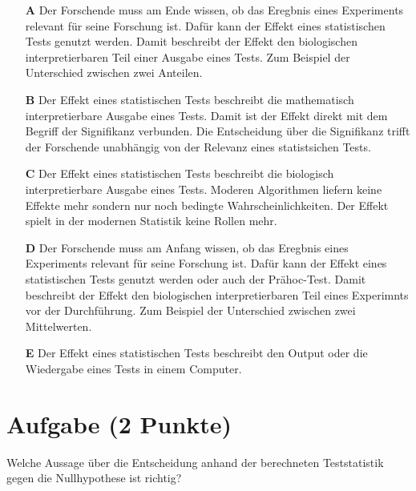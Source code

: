 \documentclass[a4paper, 9pt]{scrartcl}\usepackage[]{graphicx}\usepackage[]{xcolor}
\begin{document}
\begin{enumerate}
\item [\textbf{A} \msquare] Der Forschende muss am Ende wissen, ob das Eregbnis eines Experiments relevant für seine Forschung ist. Dafür kann der Effekt eines statistischen Tests genutzt werden. Damit beschreibt der Effekt den biologischen interpretierbaren Teil einer Ausgabe eines Tests. Zum Beispiel der Unterschied zwischen zwei Anteilen.
\item [\textbf{B} \msquare] Der Effekt eines statistischen Tests beschreibt die mathematisch interpretierbare Ausgabe eines Tests. Damit ist der Effekt direkt mit dem Begriff der Signifikanz verbunden. Die Entscheidung über die Signifikanz trifft der Forschende unabhängig von der Relevanz eines statistsichen Tests.
\item [\textbf{C} \msquare] Der Effekt eines statistischen Tests beschreibt die biologisch interpretierbare Ausgabe eines Tests. Moderen Algorithmen liefern keine Effekte mehr sondern nur noch bedingte Wahrscheinlichkeiten. Der Effekt spielt in der modernen Statistik keine Rollen mehr.
\item [\textbf{D} \msquare] Der Forschende muss am Anfang wissen, ob das Eregbnis eines Experiments relevant für seine Forschung ist. Dafür kann der Effekt eines statistischen Tests genutzt werden oder auch der Prähoc-Test. Damit beschreibt der Effekt den biologischen interpretierbaren Teil eines Experimnts vor der Durchführung. Zum Beispiel der Unterschied zwischen zwei Mittelwerten.
\item [\textbf{E} \msquare] Der Effekt eines statistischen Tests beschreibt den Output oder die Wiedergabe eines Tests in einem Computer.
\end{enumerate}

\section{Aufgabe \hfill (2 Punkte)}



Welche Aussage über die Entscheidung anhand der berechneten Teststatistik gegen die
Nullhypothese ist richtig?
\end{document}
